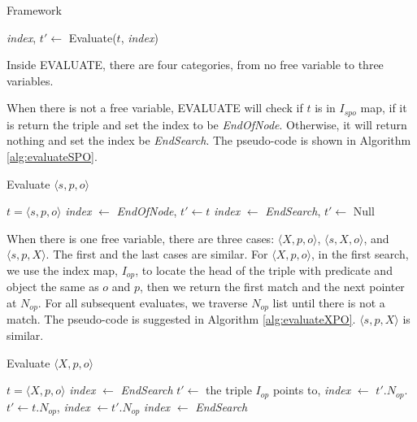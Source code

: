 \documentclass{article}
\begin{document}
\begin{enumerate}
\begin{enumerate}
\begin{algorithm}[H]
\caption{Framework}\label{alg:evaluate}
\begin{algorithmic}

\State \textit{index}, $t' \leftarrow$ Evaluate($t$, \textit{index})
\EndWhile

\end{algorithmic}
\end{algorithm}

Inside EVALUATE, there are four categories, from no free variable to three variables. 

When there is not a free variable, EVALUATE will check if $t$ is in $I_{spo}$ map, if it is return the triple and set the index to be \textit{EndOfNode}. Otherwise, it will return nothing and set the index be \textit{EndSearch}. The pseudo-code is shown in Algorithm \eqref{alg:evaluateSPO}. 

\begin{algorithm}[H]
\caption{Evaluate $\langle s, p, o\rangle$}\label{alg:evaluateSPO}
\begin{algorithmic}
\Require $t = \langle s, p, o\rangle$
\State \textit{index} $\leftarrow$ \textit{EndOfNode}, $t'\leftarrow t$
\Else
\State \textit{index} $\leftarrow$ \textit{EndSearch}, $t'\leftarrow$ Null
\EndIf
\end{algorithmic}
\end{algorithm}

When there is one free variable, there are three cases: $\langle X, p, o\rangle$, $\langle s, X, o\rangle$, and $\langle s, p, X\rangle$. The first and the last cases are similar. For $\langle X, p, o\rangle$, in the first search, we use the index map, $I_{op}$, to locate the head of the triple with predicate and object the same as $o$ and $p$, then we return the first match and the next pointer at $N_{op}$. For all subsequent evaluates, we traverse $N_{op}$ list until there is not a match. The pseudo-code is suggested in Algorithm \eqref{alg:evaluateXPO}. $\langle s, p, X\rangle$ is similar. 
 
\begin{algorithm}[H]
\caption{Evaluate $\langle X, p, o\rangle$}\label{alg:evaluateXPO}
\begin{algorithmic}
\Require $t = \langle X, p, o\rangle$
\State \textit{index} $\leftarrow$ \textit{EndSearch}
\EndIf
{} 
\State $t'\leftarrow$ the triple $I_{op}$ points to, \textit{index} $\leftarrow$ $t'.N_{op}$.
\Else{}
\State $t'\leftarrow t.N_{op}$, \textit{index} $\leftarrow t'.N_{op}$
\EndIf
{}
\State \textit{index} $\leftarrow$ \textit{EndSearch}
\EndIf
\end{algorithmic}
\end{algorithm}


\end{enumerate}
\end{enumerate}
\end{document}
